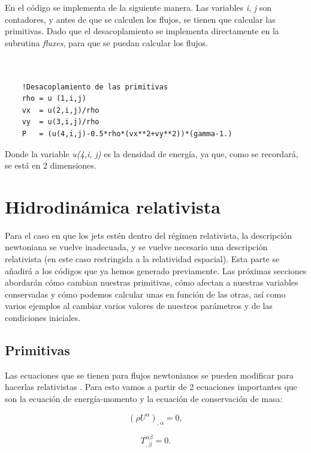 \documentclass[12pt,a4paper]{book}
\begin{document}
En el código se implementa de la siguiente manera.
Las variables \emph{i}, \emph{j} son contadores, y antes de que se calculen los flujos, se tienen que calcular las primitivas. Dado que el desacoplamiento se implementa directamente en la subrutina \emph{fluxes}, para 
que se puedan calcular los flujos.

\begin{lstlisting}[frame=single] 
  

    !Desacoplamiento de las primitivas
    rho = u (1,i,j)
    vx  = u(2,i,j)/rho
    vy  = u(3,i,j)/rho
    P   = (u(4,i,j)-0.5*rho*(vx**2+vy**2))*(gamma-1.)

\end{lstlisting}

\noindent Donde la variable \emph{u(4,i, j)} es la densidad de energía, ya que, como se recordará, se está en 2 dimensiones.
  
\section{Hidrodinámica relativista}
Para el caso en que los jets estén dentro del régimen relativista, la descripción newtoniana se vuelve inadecuada, y se vuelve necesario una descripción relativista (en este caso restringida a la relatividad
espacial).
Esta parte se añadirá a los códigos que ya hemos generado previamente. Las próximas secciones abordarán cómo cambian nuestras primitivas, cómo afectan a nuestras variables conservadas y cómo podemos calcular unas en 
función de las otras, así como varios ejemplos al cambiar varios valores de nuestros parámetros y de las condiciones iniciales.

\subsection{Primitivas}
Las ecuaciones que se tienen para flujos newtonianos se pueden modificar para hacerlas relativistas \citep{Marty1999, Landau1987}. Para esto vamos a partir de 2 ecuaciones importantes que son la ecuación de energía-momento y la ecuación de conservación 
de masa:

\begin{equation}\label{ecuacion_conservación_masa}
\left( \rho U^{\alpha} \right)_{, \alpha} =0 ,
\end{equation}

\begin{equation}\label{ecuacion_momento_energia}
T_{, \beta}^{\alpha \beta}=0 .
\end{equation}
\end{document}
